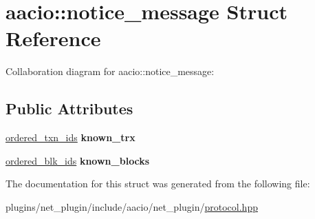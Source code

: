 \hypertarget{structaacio_1_1notice__message}{}\section{aacio\+:\+:notice\+\_\+message Struct Reference}
\label{structaacio_1_1notice__message}


Collaboration diagram for aacio\+:\+:notice\+\_\+message\+:
\subsection*{Public Attributes}
\begin{DoxyCompactItemize}
\item 
\mbox{\label{structaacio_1_1notice__message_a0f6cae0d7771f7e0b6a2e5bfb20b7daf}} 
\mbox{\hyperlink{structaacio_1_1select__ids}{ordered\+\_\+txn\+\_\+ids}} {\bfseries known\+\_\+trx}
\item 
\mbox{\label{structaacio_1_1notice__message_a712d3e2582e94a6f9a776150312b3df3}} 
\mbox{\hyperlink{structaacio_1_1select__ids}{ordered\+\_\+blk\+\_\+ids}} {\bfseries known\+\_\+blocks}
\end{DoxyCompactItemize}


The documentation for this struct was generated from the following file\+:\begin{DoxyCompactItemize}
\item 
plugins/net\+\_\+plugin/include/aacio/net\+\_\+plugin/\mbox{\hyperlink{plugins_2net__plugin_2include_2aacio_2net__plugin_2protocol_8hpp}{protocol.\+hpp}}\end{DoxyCompactItemize}
